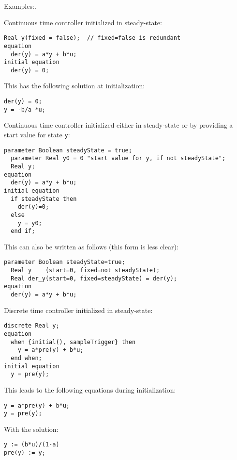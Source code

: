 Examples:.

\begin{example}
Continuous time controller initialized in steady-state:
\begin{lstlisting}[language=modelica]
  Real y(fixed = false);  // fixed=false is redundant
equation
  der(y) = a*y + b*u;
initial equation
  der(y) = 0;
\end{lstlisting}

This has the following solution at initialization:
\begin{lstlisting}[language=modelica]
der(y) = 0;
y = -b/a *u;
\end{lstlisting}
\end{example}

\begin{example}
Continuous time controller initialized either in steady-state or by providing a start value for state \lstinline!y!:
\begin{lstlisting}[language=modelica]
  parameter Boolean steadyState = true;
  parameter Real y0 = 0 "start value for y, if not steadyState";
  Real y;
equation
  der(y) = a*y + b*u;
initial equation
  if steadyState then
    der(y)=0;
  else
    y = y0;
  end if;
\end{lstlisting}

This can also be written as follows (this form is less clear):
\begin{lstlisting}[language=modelica]
  parameter Boolean steadyState=true;
  Real y    (start=0, fixed=not steadyState);
  Real der_y(start=0, fixed=steadyState) = der(y);
equation
  der(y) = a*y + b*u;
\end{lstlisting}
\end{example}

\begin{example}
Discrete time controller initialized in steady-state:
\begin{lstlisting}[language=modelica]
  discrete Real y;
equation
  when {initial(), sampleTrigger} then
    y = a*pre(y) + b*u;
  end when;
initial equation
  y = pre(y);
\end{lstlisting}

This leads to the following equations during initialization:
\begin{lstlisting}[language=modelica]
y = a*pre(y) + b*u;
y = pre(y);
\end{lstlisting}

With the solution:
\begin{lstlisting}[language=modelica]
y := (b*u)/(1-a)
pre(y) := y;
\end{lstlisting}
\end{example}

